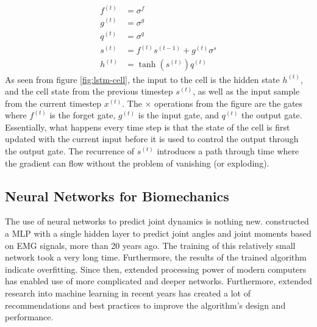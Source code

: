 \documentclass[../main.tex]{subfiles}
\begin{document}
\begin{subequations}
\label{eq:lstm-ff}
\begin{align}
    f^{(t)} &= \sigma^f\\
    g^{(t)} &= \sigma^g\\
    q^{(t)} &= \sigma^q\\
    s^{(t)} &= f^{(t)}s^{(t-1)} + g^{(t)}\sigma^s\\
    h^{(t)} &= \tanh\left(s^{(t)}\right)q^{(t)} \label{eq:last_lstm_step}
\end{align}
\end{subequations}
As seen from figure \ref{fig:lstm-cell}, the input to the cell is the hidden state $h^{(t)}$, and the cell state from the previous timestep $s^{(t)}$, as well as the input sample from the current timestep $x^{(t)}$.
The $\times$ operations from the figure are the gates where $f^{(t)}$ is the forget gate, $g^{(t)}$ is the input gate, and $q^{(t)}$ the output gate.
Essentially, what happens every time step is that the state of the cell is first updated with the current input before it is used to control the output through the output gate.
The recurrence of $s^{(t)}$ introduces a path through time where the gradient can flow without the problem of vanishing (or exploding).




\subsection{Neural Networks for Biomechanics}
The use of neural networks to predict joint dynamics is nothing new.
\textcite{Sepulveda1993} constructed a \ac{MLP} with a single hidden layer to predict joint angles and joint moments based on EMG signals, more than 20 years ago. 
The training of this relatively small network took a very long time.
Furthermore, the results of the trained algorithm indicate overfitting.
Since then, extended processing power of modern computers has enabled use of more complicated and deeper networks.
Furthermore, extended research into machine learning in recent years has created a lot of recommendations and best practices to improve the algorithm's design and performance.
\end{document}
